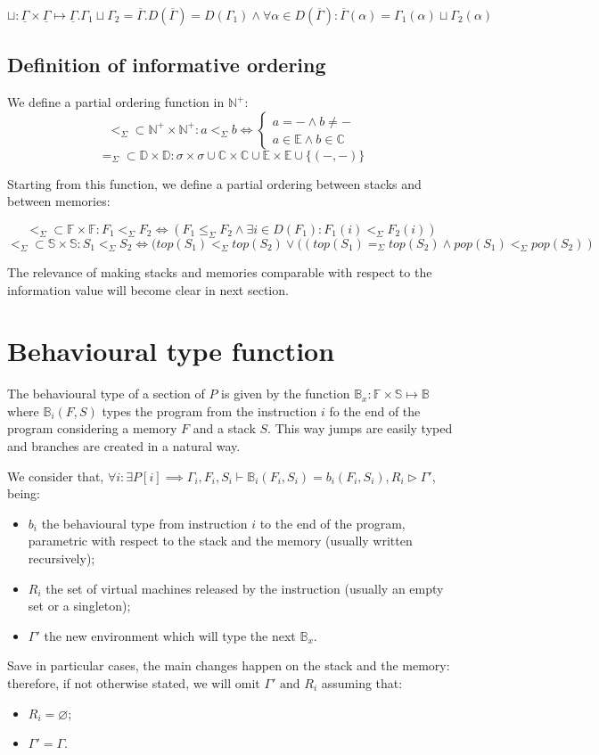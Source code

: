 \documentclass{amsart}
\newcommand{\N}{\mathbb{N}}
\newcommand{\E}{\mathbb{E}}
\newcommand{\C}{\mathbb{C}}
\newcommand{\bB}[1]{\mathbb{B}_{#1}}
\newcommand{\bF}{\mathbb{F}}
\newcommand{\bS}{\mathbb{S}}
\newcommand{\data}{\mathbb{D}}
\newcommand{\Int}{\N^+}
\newcommand{\Gset}{\underline{\Gamma}}
\newcommand{\eqs}{=_\Sigma}
\newcommand{\less}{<_\Sigma}
\newcommand{\leqs}{\leq_\Sigma}
\renewcommand{\emptyset}{\varnothing}
\numberwithin{equation}{section}
\theoremstyle{plain} %
\theoremstyle{definition}
\theoremstyle{remark}
\begin{document}
\[
\sqcup: \Gset{} \times \Gset{} \mapsto \Gset{}. \Gamma_1 \sqcup \Gamma_2 = \overline{\Gamma}. D(\overline{\Gamma}) = D(\Gamma_1) \wedge \forall \alpha \in D(\overline{\Gamma}): \overline{\Gamma}(\alpha) = \Gamma_1(\alpha) \sqcup \Gamma_2(\alpha)
\]

\subsection{Definition of informative ordering}

We define a partial ordering function in $\Int{}$:
\[\less{} \subset \Int{} \times \Int{}: a \less{} b \iff
\begin{cases}
a = - \wedge b \neq -\\
a \in \E{} \wedge b \in \C{}
\end{cases}\]
\[\eqs{} \subset \data{} \times \data{}: \sigma \times \sigma \cup \C{} \times \C{} \cup \E{} \times \E{} \cup \{(-, -)\}\]

Starting from this function, we define a partial ordering between stacks and between memories:

\[\less{} \subset \bF{} \times \bF{}: F_1 \less F_2 \iff (F_1 \leqs F_2 \wedge \exists i \in D(F_1): F_1(i) \less F_2(i))\]
\[\less \subset \bS{} \times \bS{}: S_1 \less S_2 \iff (top(S_1) \less top(S_2) \vee ((top(S_1) \eqs top(S_2) \wedge pop(S_1) \less pop(S_2))\]

The relevance of making stacks and memories comparable with respect to the information value will become clear in next section.


\section{Behavioural type function}
The behavioural type of a section of $P$ is given by the function $\bB{x}:\bF{} \times \bS{} \mapsto \bB{}$ where $\bB{i}(F, S)$ types the program from the instruction $i$ fo the end of the program considering a memory $F$ and a stack $S$. This way jumps are easily typed and branches are created in a natural way.

We consider that, $\forall i: \exists P[i] \implies \Gamma_i, F_i, S_i \vdash \bB{i}(F_i, S_i) = b_i(F_i, S_i), R_i \rhd \Gamma'$, being:
\begin{itemize}
\item $b_i$ the behavioural type from instruction $i$ to the end of the program, parametric with respect to the stack and the memory (usually written recursively);
\item $R_i$ the set of virtual machines released by the instruction (usually an empty set or a singleton);
\item $\Gamma'$ the new environment which will type the next $\bB{x}$.
\end{itemize}
Save in particular cases, the main changes happen on the stack and the memory: therefore, if not otherwise stated, we will omit $\Gamma' \text{ and } R_i$ assuming that:
\begin{itemize}
\item $R_i = \emptyset$;
\item $\Gamma' = \Gamma$.
\end{itemize}
\end{document}
